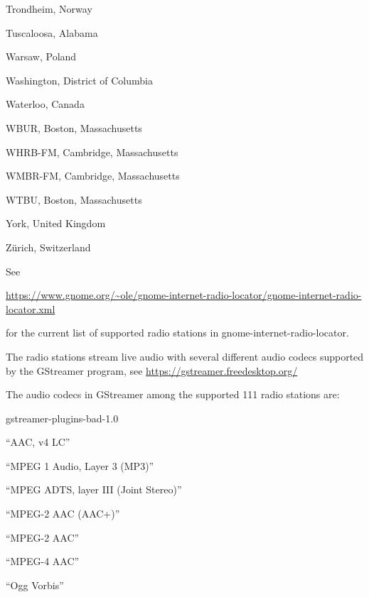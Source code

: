 \documentclass[20pt,landscape]{foils}
\begin{document}
\begin{list1}
\begin{list2}
  \item Trondheim, Norway
  \item Tuscaloosa, Alabama
  \item Warsaw, Poland
  \item Washington, District of Columbia
  \item Waterloo, Canada
  \item WBUR, Boston, Massachusetts
  \item WHRB-FM, Cambridge, Massachusetts
  \item WMBR-FM, Cambridge, Massachusetts
  \item WTBU, Boston, Massachusetts
  \item York, United Kingdom
  \item Zürich, Switzerland
  \end{list2}
\end{list1}

See
\begin{tiny}\url{https://www.gnome.org/~ole/gnome-internet-radio-locator/gnome-internet-radio-locator.xml}\end{tiny} for the current list of supported radio stations in gnome-internet-radio-locator.


The radio stations stream live audio with several different audio codecs supported by the GStreamer program, see \url{https://gstreamer.freedesktop.org/}

The audio codecs in GStreamer among the supported 111 radio stations are:

\begin{list1}
  \item gstreamer-plugins-bad-1.0
    \begin{list2}
    \item ``AAC, v4 LC''
    \item ``MPEG 1 Audio, Layer 3 (MP3)''
    \item ``MPEG ADTS, layer III (Joint Stereo)''
    \item ``MPEG-2 AAC (AAC+)''
    \item ``MPEG-2 AAC''
    \item ``MPEG-4 AAC''
    \item ``Ogg Vorbis''
    \end{list2}
\end{list1}

\end{document}
